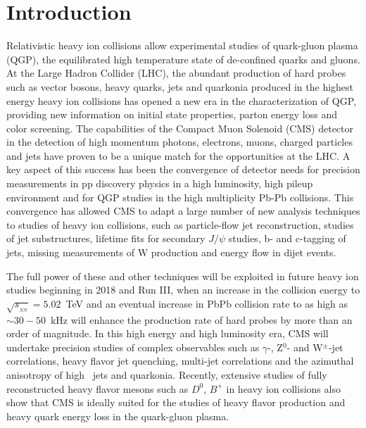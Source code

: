 \section{Introduction}
\label{sec:intro}

Relativistic heavy ion collisions allow experimental studies of quark-gluon plasma (QGP), the equilibrated high temperature state of de-confined quarks and gluons. At the Large Hadron Collider (LHC), the abundant production of hard probes such as vector bosons, heavy quarks, jets and quarkonia produced in the highest energy heavy ion collisions has opened a new era in the characterization of QGP, providing new information on initial state properties, parton energy loss and color screening. The capabilities of the Compact Muon Solenoid (CMS) detector in the detection of high momentum photons, electrons, muons, charged particles and jets have proven to be a unique match for the opportunities at the LHC. A key aspect of this success has been the convergence of detector needs for precision measurements in pp discovery physics in a high luminosity, high pileup environment and for QGP studies in the high multiplicity Pb-Pb collisions. This convergence has allowed CMS to adapt a large number of new analysis techniques to studies of heavy ion collisions, such as particle-flow jet reconstruction, studies of jet substructures, lifetime fits for secondary $J/\psi$ studies,  b- and c-tagging of jets, missing \pt measurements of W production and energy flow in dijet events. 

The full power of these and other techniques will be exploited in future heavy ion studies beginning in 2018 and Run III, when an increase in the collision energy to $\sqrt{s_{_{NN}}} = 5.02$~TeV and an eventual increase in PbPb collision rate to as high as $\sim 30-50$~kHz will enhance the production rate of hard probes by more than an order of magnitude. In this high energy and high luminosity era, CMS will undertake precision studies of complex observables such as $\gamma$-, Z$^0$- and W$^\pm$-jet correlations, heavy flavor jet quenching, multi-jet correlations and the azimuthal anisotropy of high \pt\ jets and quarkonia. Recently, extensive studies of fully reconstructed heavy flavor mesons such as $D^0$, $B^+$ in heavy ion collisions also show that CMS is ideally suited for the studies of heavy flavor production and heavy quark energy loss in the quark-gluon plasma.

